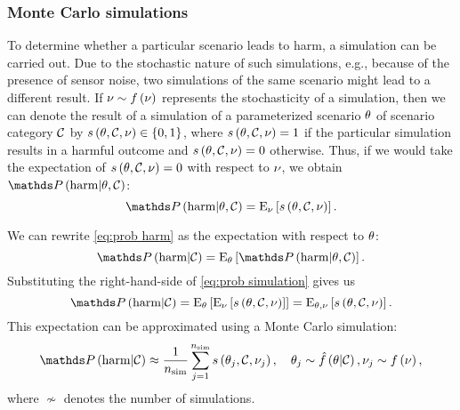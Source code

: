 \subsubsection{Monte Carlo simulations}
\label{sec:monte carlo}

To determine whether a particular scenario leads to harm, a simulation can be carried out. Due to the stochastic nature of such simulations, e.g., because of the presence of sensor noise, two simulations of the same scenario might lead to a different result. If $\nu\sim f\left( \nu \right)$ represents the stochasticity of a simulation, then we can denote the result of a simulation of a parameterized scenario $\theta$ of scenario category $\mathcal{C}$ by $s\left( \theta, \mathcal{C}, \nu \right) \in \{0, 1\}$, where $s\left( \theta, \mathcal{C}, \nu \right)=1$ if the particular simulation results in a harmful outcome and $s\left( \theta, \mathcal{C}, \nu \right)=0$ otherwise. Thus, if we would take the expectation of $s\left( \theta, \mathcal{C}, \nu \right)=0$ with respect to $\nu$, we obtain $\probabilitycond{\harm}{\parvector,\scenariocategory}$:
\begin{equation}
	\label{eq:prob simulation}
	\probabilitycond{\harm}{\parvector,\scenariocategory} =
	\expectationwrt{\dummystochastic}{\simulation{\parvector, \scenariocategory, \dummystochastic}}.
\end{equation}

We can rewrite \cref{eq:prob harm} as the expectation with respect to $\theta$:
\begin{equation}
	\probabilitycond{\harm}{\scenariocategory} =
	\expectationwrt{\parvector}{\probabilitycond{\harm}{\parvector,\scenariocategory}}.
\end{equation}
Substituting the right-hand-side of \cref{eq:prob simulation} gives us
\begin{equation}
	\label{eq:expectation harm}
	\probabilitycond{\harm}{\scenariocategory} =
	\expectationwrt{\parvector}{\expectationwrt{\dummystochastic}{\simulation{\parvector, \scenariocategory, \dummystochastic}}} =
	\expectationwrt{\parvector,\dummystochastic}{\simulation{\parvector, \scenariocategory, \dummystochastic}}.
\end{equation}
This expectation can be approximated using a Monte Carlo simulation:
\begin{equation}
	\label{eq:monte carlo}
	\probabilitycond{\harm}{\scenariocategory} \approx 
	\frac{1}{\nsim} \sum_{\indexb=1}^{\nsim} \simulation{\parvectorscen{\indexb}, \scenariocategory, \dummystochastic_{\indexb}}, \quad 
	\parvectorscen{\indexb}\sim\densityestcond{\parvector}{\scenariocategory},
	\dummystochastic_{\indexb}\sim\density{\dummystochastic},
\end{equation}
where $\nsim$ denotes the number of simulations.



